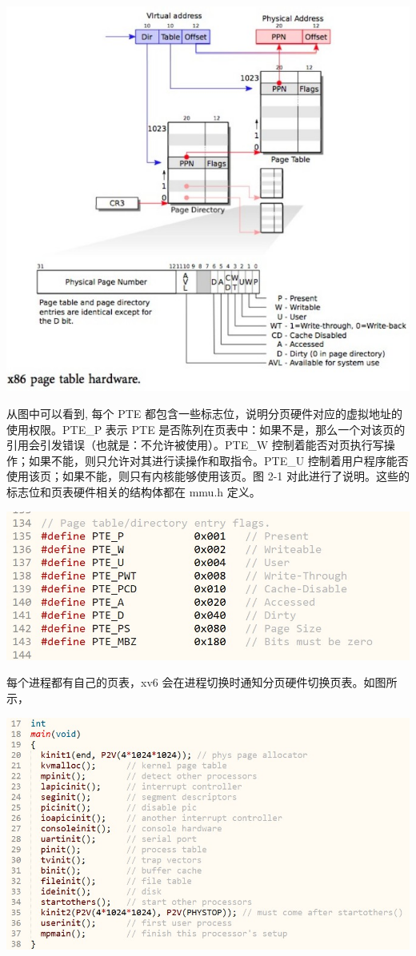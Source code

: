 \includegraphics[width=6in]{figures/mem/fig3.png}

从图中可以看到, 每个 PTE 都包含一些标志位，说明分页硬件对应的虚拟地址的使用权限。PTE\_P 表示 PTE 是否陈列在页表中：如果不是，那么一个对该页的引用会引发错误（也就是：不允许被使用）。PTE\_W 控制着能否对页执行写操作；如果不能，则只允许对其进行读操作和取指令。PTE\_U 控制着用户程序能否使用该页；如果不能，则只有内核能够使用该页。图 2-1 对此进行了说明。这些的标志位和页表硬件相关的结构体都在 mmu.h 定义。

\includegraphics[width=6in]{figures/mem/fig4.png}

每个进程都有自己的页表，xv6 会在进程切换时通知分页硬件切换页表。如图所示，

\includegraphics[width=6in]{figures/mem/fig5.png}

